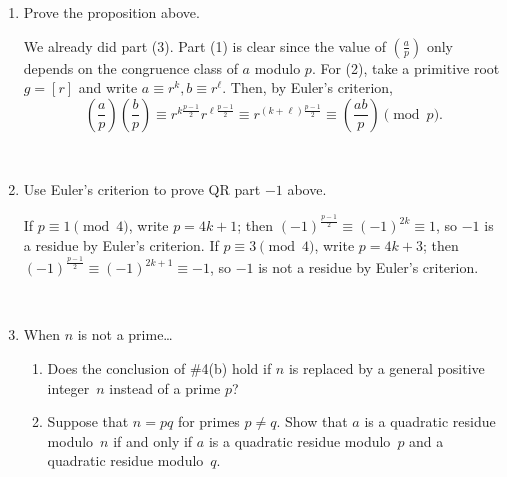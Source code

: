 \documentclass[12pt]{amsart}
\newcommand{\solution}[1]{\ifthenelse {\equal{\displaysol}{1}} {\begin{framed}{\color{meretale}\noindent #1}\end{framed}} { \ }}
\begin{document}
\begin{enumerate}
\item Prove the proposition above.

\solution{We already did part (3). Part (1) is clear since the value of $\left( \frac{a}{p} \right)$ only depends on the congruence class of $a$ modulo $p$. For (2), take a primitive root $g=[r]$ and write $a\equiv r^k, b\equiv r^\ell$. Then, by Euler's criterion,
\[ \left(\frac{a}{p}\right) \left(\frac{b}{p}\right) \equiv r^{k \frac{p-1}{2}} r^{\ell \frac{p-1}{2}} \equiv r^{(k +\ell)\frac{p-1}{2}}\equiv \left(\frac{ab}{p}\right) \pmod{p}.\]
}

\item Use Euler's criterion to prove QR part $-1$ above.

\solution{If $p\equiv 1 \pmod{4}$, write $p=4k+1$; then $(-1)^{\frac{p-1}{2}} \equiv (-1)^{2k} \equiv 1$, so $-1$ is a residue by Euler's criterion. If $p\equiv 3 \pmod{4}$, write $p=4k+3$; then $(-1)^{\frac{p-1}{2}} \equiv (-1)^{2k+1} \equiv -1$, so $-1$ is not a residue by Euler's criterion.}

\item When $n$ is not a prime\dots
\begin{enumerate}
\item Does the conclusion of \#4(b) hold if $n$ is replaced by a general positive integer~$n$ instead of a prime $p$?
\item Suppose that $n=pq$ for primes $p\neq q$. Show that $a$ is a quadratic residue modulo~$n$ if and only if $a$ is a quadratic residue modulo~$p$ and a quadratic residue modulo~$q$.
\end{enumerate}


\end{enumerate}
\end{document}
